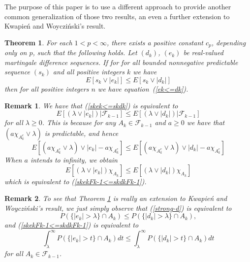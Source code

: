 \documentclass[12pt]{amsart}
\newtheorem{thm}{Theorem}
\newtheorem{rem}{Remark}
\begin{document}
The purpose of this paper is to use a different approach to
provide another common generalization of those two results, an
even a further extension to Kwapie\'n and Woyczi\'nski's
result.

\begin{thm}
\label{t ek<=dk sk}
For each $1<p<\infty$, there exists a positive constant $c_p$,
depending only on $p$, such
that the following holds.
Let $(d_k)$, $(e_k)$ be real-valued martingale
difference sequences. If for for all bounded nonnegative predictable
sequence $(s_k)$ and all positive integers $k$ we have
\begin{equation}
\label{skek<=skdk}
E[s_k\vee |e_k|]\leq E[s_k \vee |d_k|]
\end{equation}
then for all positive integers $n$ we have
equation~(\ref{ek<=dk}).
\end{thm}

\begin{rem} {\upshape
We have that (\ref{skek<=skdk}) is
equivalent to
\begin{equation}
\label{skekFk-1<=skdkFk-1} E[(\lambda \vee
|e_k|)|\mathcal{F}_{k-1}]\leq E[(\lambda \vee
|d_k|)|\mathcal{F}_{k-1}]
\end{equation}
for all $\lambda \geq 0$. This is because for any $A_k \in
\mathcal{F}_{k-1}$ and $a \geq 0$ we have that 
$(a \chi_{A_k^c} \vee \lambda)$ is
predictable, and hence
\[E[(a \chi_{A_k^c} \vee \lambda ) \vee |e_k| - a \chi_{A_k^c}]
\leq E[(a \chi_{A_k^c} \vee \lambda ) \vee |d_k| - a \chi_{A_k^c}]\]
When $a$ intends to infinity, we obtain
\[E[( \lambda \vee |e_k|)\chi_{A_k}]\leq E[(\lambda \vee |d_k|)\chi_{A_k}]\]
which is equivalent to (\ref{skekFk-1<=skdkFk-1}).
}\end{rem}

\begin{rem} {\upshape
To see  that Theorem \ref{t ek<=dk sk} is really an extension
to Kwapie\'n and Woyczi\'nski's result, we just simply observe
that (\ref{strong-d}) is equivalent to
$$P(\{|e_k|>\lambda \} \cap A_k) \leq P(\{|d_k|>\lambda \} \cap
A_k),$$ and (\ref{skekFk-1<=skdkFk-1}) is equivalent to
$$\int_\lambda^\infty P(\{|e_k|>t \} \cap A_k)dt \leq \int_\lambda^\infty P(\{|d_k|>t \} \cap A_k)dt$$
for all $A_k \in \mathcal{F}_{k-1}$.
}\end{rem}
\end{document}
